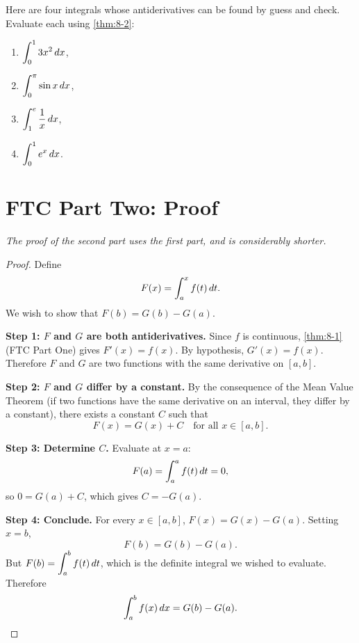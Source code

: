 \begin{remark}
Here are four integrals whose antiderivatives can be found by guess and check.  Evaluate each using \cref{thm:8-2}:
\begin{enumerate}[label=(\roman*)]
  \item $\displaystyle\int_{0}^{1} 3x^{2}\,dx$,
  \item $\displaystyle\int_{0}^{\pi} \sin x\,dx$,
  \item $\displaystyle\int_{1}^{e} \dfrac{1}{x}\,dx$,
  \item $\displaystyle\int_{0}^{1} e^{x}\,dx$.
\end{enumerate}
\end{remark}

\section{FTC Part Two: Proof}
\label{sec:8.6}

\textit{The proof of the second part uses the first part, and is considerably shorter.}

\begin{proof}
Define
\[
  F(x) = \int_{a}^{x} f(t)\,dt.
\]
We wish to show that $F(b) = G(b) - G(a)$.


\textbf{Step 1: $F$ and $G$ are both antiderivatives.}  Since $f$ is continuous, \cref{thm:8-1} (FTC Part One) gives $F'(x) = f(x)$.  By hypothesis, $G'(x) = f(x)$.  Therefore $F$ and $G$ are two functions with the same derivative on $[a,b]$.

\textbf{Step 2: $F$ and $G$ differ by a constant.}  By the consequence of the Mean Value Theorem (if two functions have the same derivative on an interval, they differ by a constant), there exists a constant $C$ such that
\[
  F(x) = G(x) + C \quad \text{for all } x \in [a,b].
\]


\textbf{Step 3: Determine $C$.}  Evaluate at $x = a$:
\[
  F(a) = \int_{a}^{a} f(t)\,dt = 0,
\]
so $0 = G(a) + C$, which gives $C = -G(a)$.

\textbf{Step 4: Conclude.}  For every $x \in [a,b]$, $F(x) = G(x) - G(a)$.  Setting $x = b$,
\[
  F(b) = G(b) - G(a).
\]
But $F(b) = \displaystyle\int_{a}^{b} f(t)\,dt$, which is the definite integral we wished to evaluate.  Therefore
\[
  \int_{a}^{b} f(x)\,dx = G(b) - G(a). \qedhere
\]
\end{proof}

